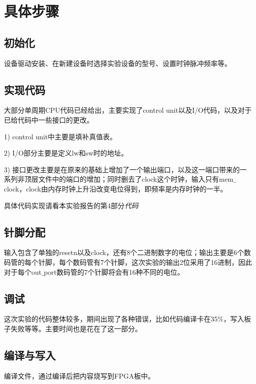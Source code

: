 \documentclass{article}
\begin{document}
        
    \section{具体步骤}
    
    	\subsection{初始化} 设备驱动安装、在新建设备时选择实验设备的型号、设置时钟脉冲频率等。
        
        \subsection{实现代码} 大部分单周期CPU代码已经给出，主要实现了control unit以及I/O代码，以及对于已给代码中一些接口的更改。
        \par 1) control unit中主要是填补真值表。
        \par 2) I/O部分主要是定义lw和sw时的地址。
        \par 3) 接口更改主要是在原来的基础上增加了一个输出端口，以及这一端口带来的一系列非顶层文件中的端口的增加；同时删去了clock这个时钟，输入只有mem$\_$clock，clock由内存时钟上升沿改变电位得到，即频率是内存时钟的一半。
        \par 具体代码实现请看本实验报告的第4部分\emph{代码}
        
        \subsection{针脚分配} 输入包含了单独的resetn以及clock，还有8个二进制数字的电位；输出主要是6个数码管的每个针脚，每个数码管有7个针脚，这次实验的输出2位采用了16进制，因此对于每个out$\_$port数码管的7个针脚将会有16种不同的电位。
        
        \subsection{调试} 这次实验的代码整体较多，期间出现了各种错误，比如代码编译卡在35\%，写入板子失败等等。主要时间也是花在了这一部分。
        
        \subsection{编译与写入} 编译文件，通过编译后把内容烧写到FPGA板中。
    
\end{document}
